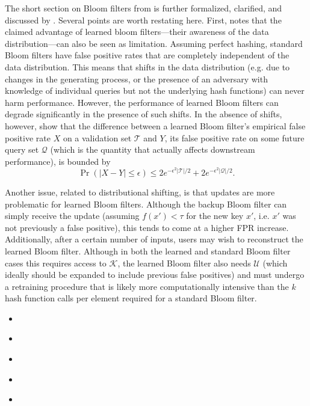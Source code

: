 \documentclass{article}
\begin{document}
The short section on Bloom filters from \citet{kraska2018case} is further
formalized, clarified, and discussed by \citet{mitzenmacher2018model}. Several
points are worth restating here. First, \citet{mitzenmacher2018model} notes
that the claimed advantage of learned bloom filters---their awareness of the
data distribution---can also be seen as limitation. Assuming perfect hashing,
standard Bloom filters have false positive rates that are completely
independent of the data distribution. This means that shifts in the data
distribution (e.g. due to changes in the generating process, or the presence of
an adversary with knowledge of individual queries but not the underlying hash
functions) can never harm performance. However, the performance of learned
Bloom filters can degrade significantly in the presence of such shifts.
In the absence of shifts, however, \citet{mitzenmacher2018model} show that
the difference between a learned Bloom filter's empirical false positive rate
$X$ on a validation set $\mathcal{T}$ and $Y$, its false positive rate on some
future query set $\mathcal{Q}$ (which is the quantity that actually affects
downstream performance), is bounded by \begin{equation}
  \Pr(|X-Y| \leq \epsilon) \leq 2e^{-\epsilon^2|\mathcal{T}|/2} + 2e^{-\epsilon^2|\mathcal{Q}|/2}.
\end{equation}

Another issue, related to distributional shifting, is that updates are more
problematic for learned Bloom filters. Although the backup Bloom filter can
simply receive the update (assuming $f(x') < \tau$ for the new key $x'$, i.e.
$x'$ was not previously a false positive), this tends to come at a higher FPR
increase. Additionally, after a certain number of inputs, users may wish to
reconstruct the learned Bloom filter. Although in both the learned and standard
Bloom filter cases this requires access to $\mathcal{K}$, the learned Bloom
filter also needs $\mathcal{U}$ (which ideally should be expanded to include
previous false positives) and must undergo a retraining procedure that is
likely more computationally intensive than the $k$ hash function calls per
element required for a standard Bloom filter.

\begin{itemize}
    \item \cite{rae2019meta}
    \item \cite{hadian2019considerations}
    \item \cite{mitzenmacher2018model}
    \item \cite{mitzenmacher2018model2}
    \item \cite{liangempirical}
\end{itemize}
\end{document}
